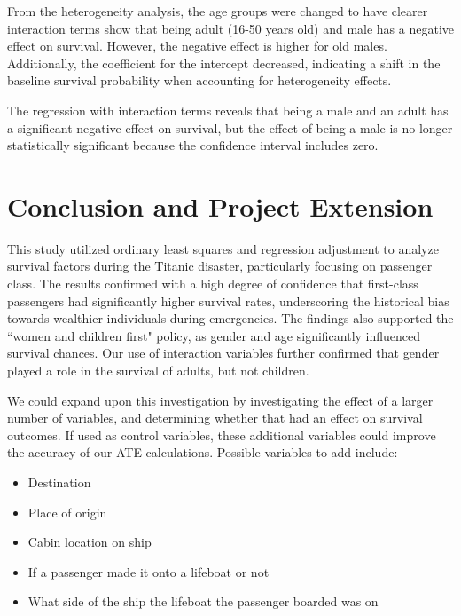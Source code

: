 \documentclass[12pt]{article}
\begin{document}
From the heterogeneity analysis, the age groups were changed to have clearer interaction terms show that being adult (16-50 years old) and male has a negative effect on survival. However, the negative effect is higher for old males. Additionally, the coefficient for the intercept decreased, indicating a shift in the baseline survival probability when accounting for heterogeneity effects.

The regression with interaction terms reveals that being a male and an adult has a significant negative effect on survival, but the effect of being a male is no longer statistically significant because the confidence interval includes zero.  

\section{Conclusion and Project Extension}

This study utilized ordinary least squares and regression adjustment to analyze survival factors during the Titanic disaster, particularly focusing on passenger class. The results confirmed with a high degree of confidence that first-class passengers had significantly higher survival rates, underscoring the historical bias towards wealthier individuals during emergencies. The findings also supported the ``women and children first" policy, as gender and age significantly influenced survival chances. Our use of interaction variables further confirmed that gender played a role in the survival of adults, but not children.

We could expand upon this investigation by investigating the effect of a larger number of variables, and determining whether that had an effect on survival outcomes. If used as control variables, these additional variables could improve the accuracy of our ATE calculations. Possible variables to add include:
\begin{itemize}
    \item Destination
    \item Place of origin
    \item Cabin location on ship
    \item If a passenger made it onto a lifeboat or not
    \item What side of the ship the lifeboat the passenger boarded was on
\end{itemize}

\pagebreak
\printbibliography
\end{document}
